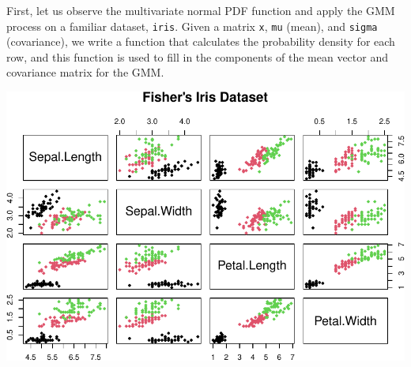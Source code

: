 \documentclass[12pt]{article}
\newenvironment{Shaded}{\begin{snugshade}}{\end{snugshade}}
\newcommand{\AttributeTok}[1]{\textcolor[rgb]{0.13,0.29,0.53}{#1}}
\newcommand{\CommentTok}[1]{\textcolor[rgb]{0.56,0.35,0.01}{\textit{#1}}}
\newcommand{\ControlFlowTok}[1]{\textcolor[rgb]{0.13,0.29,0.53}{\textbf{#1}}}
\newcommand{\DecValTok}[1]{\textcolor[rgb]{0.00,0.00,0.81}{#1}}
\newcommand{\FunctionTok}[1]{\textcolor[rgb]{0.13,0.29,0.53}{\textbf{#1}}}
\newcommand{\NormalTok}[1]{#1}
\newcommand{\OtherTok}[1]{\textcolor[rgb]{0.56,0.35,0.01}{#1}}
\newcommand{\SpecialCharTok}[1]{\textcolor[rgb]{0.81,0.36,0.00}{\textbf{#1}}}
\newcommand{\StringTok}[1]{\textcolor[rgb]{0.31,0.60,0.02}{#1}}
\begin{document}
First, let us observe the multivariate normal PDF function and apply the
GMM process on a familiar dataset, \texttt{iris}. Given a matrix
\texttt{x}, \texttt{mu} (mean), and \texttt{sigma} (covariance), we
write a function that calculates the probability density for each row,
and this function is used to fill in the components of the mean vector
and covariance matrix for the GMM.

\begin{Shaded}
\end{Shaded}

\includegraphics{ProjectDraftForPeer_files/figure-latex/unnamed-chunk-5-1.pdf}
\end{document}
